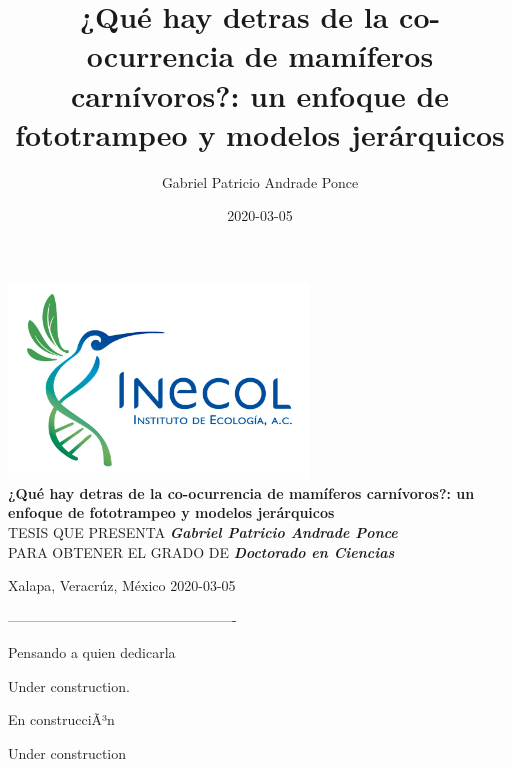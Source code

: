 \documentclass[12pt,twoside]{reedthesis}
\title{¿Qué hay detras de la co-ocurrencia de mamíferos carnívoros?: un enfoque de fototrampeo y modelos jerárquicos}
\author{Gabriel Patricio Andrade Ponce}
\date{2020-03-05}
\begin{document}
%
\frontmatter %
\pagestyle{empty} %
\begin{flushleft}
  
  \medskip
  \medskip
  \includegraphics[width=0.60\textwidth]{Inecol.jpeg}\\\vspace {3.cm} 
  {\Large{\bf ¿Qué hay detras de la co-ocurrencia de mamíferos carnívoros?: un enfoque de fototrampeo y modelos jerárquicos}}\\\vspace{3.cm} 
  TESIS QUE PRESENTA \textit{\textbf{Gabriel Patricio Andrade Ponce}}\\
  PARA OBTENER EL GRADO DE \textit{\textbf{Doctorado en Ciencias}}\\\vspace{2.cm} 
  \medskip
  \medskip
  
  Xalapa, Veracrúz, México 2020-03-05
  
-------------------------------------------------  
\end{flushleft}
  \begin{dedication}
    Pensando a quien dedicarla
  \end{dedication}
  \begin{acknowledgements}
    Under construction.
  \end{acknowledgements}
  \begin{resumen}
    En construcciÃ³n
    
    Under construction
  \end{resumen}


  \setcounter{tocdepth}{2}
  \tableofcontents

  \listoftables

  \listoffigures

\mainmatter %
\pagestyle{fancyplain} %
\end{document}
